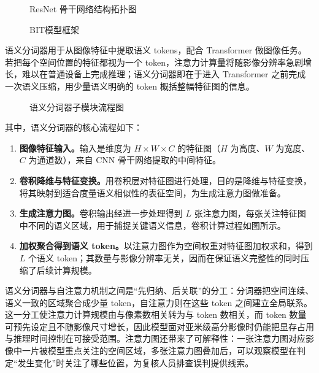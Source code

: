 \begin{figure}[htbp]
    \centering
    \caption{ResNet 骨干网络结构拓扑图}
    \label{fig:5}
\end{figure}

\begin{figure}[htbp]
    \centering
    \caption{BIT模型框架}
    \label{fig:6}
\end{figure}

语义分词器用于从图像特征中提取语义 tokens，配合 Transformer 做图像任务。若把每个空间位置的特征都视为一个 token，注意力计算量将随影像分辨率急剧增长，难以在普通设备上完成推理；语义分词器即在于进入 Transformer 之前完成一次语义压缩，用少量语义明确的 token 概括整幅特征图的信息。

\begin{figure}[htbp]
    \centering
    \caption{语义分词器子模块流程图}
    \label{fig:7}
\end{figure}

其中，语义分词器的核心流程如下：

\begin{enumerate}
    \item \textbf{图像特征输入。}输入是维度为 $H \times W \times C$ 的特征图（$H$ 为高度、$W$ 为宽度、$C$ 为通道数），来自 CNN 骨干网络提取的中间特征。
    \item \textbf{卷积降维与特征变换。}用卷积层对特征图进行处理，目的是降维与特征变换，将其映射到适合度量语义相似性的表征空间，为生成注意力图做准备。
    \item \textbf{生成注意力图。}卷积输出经进一步处理得到 $L$ 张注意力图，每张关注特征图中不同的语义区域，用于捕捉关键语义信息，卷积计算过程如图所示。
    \item \textbf{加权聚合得到语义 token。}以注意力图作为空间权重对特征图加权求和，得到 $L$ 个语义 token；其数量与影像分辨率无关，因而在保证语义完整性的同时压缩了后续计算规模。
\end{enumerate}

语义分词器与自注意力机制之间是“先归纳、后关联”的分工：分词器把空间连续、语义一致的区域聚合成少量 token，自注意力则在这些 token 之间建立全局联系。这一分工使注意力计算规模由与像素数相关转为与 token 数相关，而 token 数量可预先设定且不随影像尺寸增长，因此模型面对亚米级高分影像时仍能把显存占用与推理时间控制在可接受范围。注意力图还带来了可解释性：一张注意力图对应影像中一片被模型重点关注的空间区域，多张注意力图叠加后，可以观察模型在判定“发生变化”时关注了哪些位置，为复核人员排查误判提供线索。

